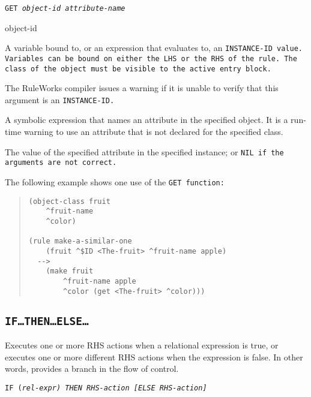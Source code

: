 \Format

\tt{GET} \it{object-id} \ct\it{attribute-name}

\begin{arguments}
\item[object-id]

  A variable bound to, or an expression that evaluates to, an
  \tt{INSTANCE-ID} value. Variables can be bound on either the LHS or
  the RHS of the rule. The class of the object must be visible to the
  active entry block.

  The RuleWorks compiler issues a warning if it is unable to verify
  that this argument is an \tt{INSTANCE-ID}.

\item[\ct{attribute-name}]

  A symbolic expression that names an attribute in the specified
  object. It is a run-time warning to use an attribute that is not
  declared for the specified class.
\end{arguments}

\ReturnValue

The value of the specified attribute in the specified instance; or
\tt{NIL} if the arguments are not correct.

\Example

The following example shows one use of the \tt{GET} function:

\begin{quote}
\begin{verbatim}
(object-class fruit
    ^fruit-name
    ^color)

(rule make-a-similar-one
    (fruit ^$ID <The-fruit> ^fruit-name apple)
  -->
    (make fruit
        ^fruit-name apple 
        ^color (get <The-fruit> ^color)))
\end{verbatim}
\end{quote}

\subsection{\tt{IF}\ldots\tt{THEN}\ldots\tt{ELSE}\ldots}

Executes one or more RHS actions when a relational expression is true,
or executes one or more different RHS actions when the expression is
false. In other words, provides a branch in the flow of control.

\Format

\tt{IF} (\it{rel-expr})
     \tt{THEN} \it{RHS-action}
     [\tt{ELSE} \it{RHS-action}]

